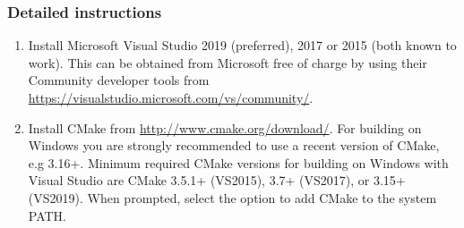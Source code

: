 \subsubsection{Detailed instructions}

\begin{enumerate}
  \item Install Microsoft Visual Studio 2019 (preferred), 2017 or 2015 (both
  known to work). This can be obtained from Microsoft free of charge by using
  their Community developer tools from
  \url{https://visualstudio.microsoft.com/vs/community/}.

  \item Install CMake from \url{http://www.cmake.org/download/}. For building
  on Windows you are strongly recommended to use a recent version of CMake,
  e.g 3.16+. Minimum required CMake versions for building \nekpp on Windows
  with Visual Studio are CMake 3.5.1+ (VS2015), 3.7+ (VS2017), or 3.15+ 
  (VS2019). When prompted, select the option to add CMake to the system PATH.


\end{enumerate}
